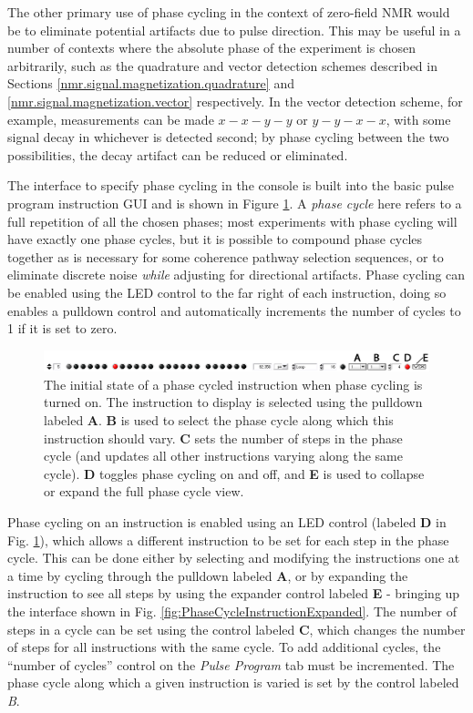 \documentclass[PaulGanssle-Thesis.tex]{subfiles}
\begin{document}
The other primary use of phase cycling in the context of zero-field NMR would be to eliminate potential artifacts due to pulse direction. This may be useful in a number of contexts where the absolute phase of the experiment is chosen arbitrarily, such as the quadrature and vector detection schemes described in Sections \ref{nmr.signal.magnetization.quadrature} and \ref{nmr.signal.magnetization.vector} respectively. In the vector detection scheme, for example, measurements can be made $x-x-y-y$ or $y-y-x-x$, with some signal decay in whichever is detected second; by phase cycling between the two possibilities, the decay artifact can be reduced or eliminated.

The interface to specify phase cycling in the console is built into the basic pulse program instruction GUI and is shown in Figure \ref{fig:PhaseCycleInstructionCollapsedLabeled}. A \textit{phase cycle} here refers to a full repetition of all the chosen phases; most experiments with phase cycling will have exactly one phase cycles, but it is possible to compound phase cycles together as is necessary for some coherence pathway selection sequences, or to eliminate discrete noise \textit{while} adjusting for directional artifacts. Phase cycling can be enabled using the LED control to the far right of each instruction, doing so enables a pulldown control and automatically increments the number of cycles to 1 if it is set to zero.

\begin{figure}
\includegraphics[width=\tw]{figures/console/PhaseCycledInstructionCollapsed01Labeled.png}
\caption{The initial state of a phase cycled instruction when phase cycling is turned on. The instruction to display is selected using the pulldown labeled \textbf{A}. \textbf{B} is used to select the phase cycle along which this instruction should vary. \textbf{C} sets the number of steps in the phase cycle (and updates all other instructions varying along the same cycle). \textbf{D} toggles phase cycling on and off, and \textbf{E} is used to collapse or expand the full phase cycle view.}
\label{fig:PhaseCycleInstructionCollapsedLabeled}
\end{figure}

Phase cycling on an instruction is enabled using an LED control (labeled \textbf{D} in Fig. \ref{fig:PhaseCycleInstructionCollapsedLabeled}), which allows a different instruction to be set for each step in the phase cycle. This can be done either by selecting and modifying the instructions one at a time by cycling through the pulldown labeled \textbf{A}, or by expanding the instruction to see all steps by using the expander control labeled \textbf{E} - bringing up the interface shown in Fig. \ref{fig:PhaseCycleInstructionExpanded}. The number of steps in a cycle can be set using the control labeled \textbf{C}, which changes the number of steps for all instructions with the same cycle. To add additional cycles, the ``number of cycles'' control on the \textit{Pulse Program} tab must be incremented. The phase cycle along which a given instruction is varied is set by the control labeled \textit{B}.
\end{document}
